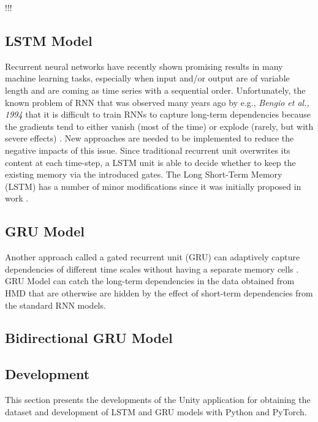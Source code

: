 !!! 
 
\subsection{LSTM Model}
\label{sec:impl:model:arch:lstm}
Recurrent neural networks have recently shown promising results in many machine learning tasks, especially when input and/or output are of variable length and are coming as time series with a sequential order. Unfortunately, the known problem of RNN that was observed many years ago by e.g., \textit{Bengio et al., 1994} that it is difficult to train RNNs to capture long-term dependencies because the gradients tend to either vanish (most of the time) or explode (rarely, but with severe effects) \cite{rnn_difficults}. New approaches are needed to be implemented to reduce the negative impacts of this issue. Since traditional recurrent unit overwrites its content at each time-step, a LSTM unit is able to decide whether to keep the existing memory via the introduced gates. The Long Short-Term Memory (LSTM) has a number of minor modifications \cite{empirical_evaluation} since it was initially proposed in work \cite{lstm_orig}.

\subsection{GRU Model}
\label{sec:impl:model:arch:gru}
Another approach called a gated recurrent unit (GRU) can adaptively capture dependencies of different time scales without having a separate memory cells \cite{empirical_evaluation}. GRU Model can catch the long-term dependencies in the data obtained from HMD that are otherwise are hidden by the effect of short-term dependencies from the standard RNN models.\\

\subsection{Bidirectional GRU Model}
\label{sec:impl:model:arch:bi-gru}


\subsection{Development}
\label{sec:impl:model:dev}
This section presents the developments of the Unity application for obtaining the dataset and development of LSTM and GRU models with Python and PyTorch. 

